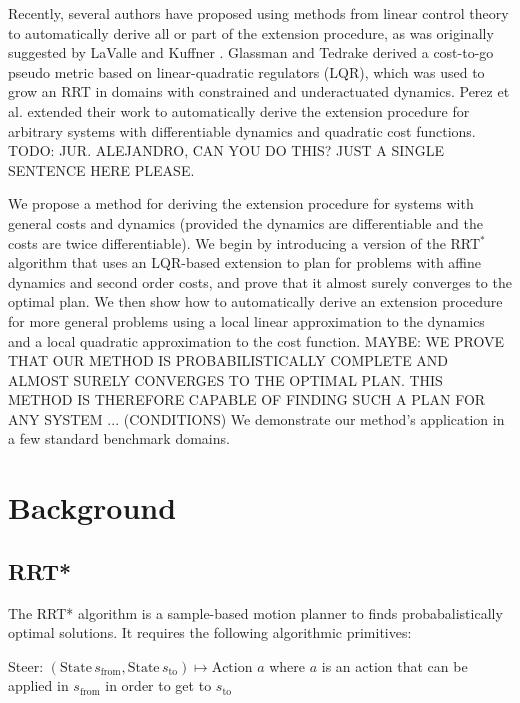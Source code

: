 \documentclass[letterpaper, 10pt, english, conference]{IEEEtran}
\begin{document}
Recently, several authors have proposed using methods from linear
control theory to automatically derive all or part of the extension
procedure, as was originally suggested by LaValle and Kuffner
\cite{lavalle.kuffner.ijrr01}. Glassman and Tedrake \cite{elena.russ.icra10}
derived a cost-to-go pseudo metric based on linear-quadratic regulators (LQR),
which was used to grow an RRT in domains with constrained and 
underactuated dynamics. Perez et al. \cite{Perez12} extended their work
to automatically derive the extension procedure for arbitrary systems
with differentiable dynamics and quadratic cost functions. 
TODO: JUR. ALEJANDRO, CAN YOU DO THIS? JUST A SINGLE SENTENCE HERE
PLEASE.

We propose a method for deriving the extension procedure for systems
with general costs and dynamics (provided the dynamics are differentiable
and the costs are twice differentiable). We begin by introducing a 
version of the RRT$^*$ algorithm that uses an LQR-based
extension to plan for problems with affine dynamics and second order costs,
and prove that it almost surely converges to the optimal plan.  
We then show how to automatically derive an
extension procedure for more general problems using
a local linear approximation to the dynamics and a local quadratic
approximation to the cost function. 
MAYBE: WE PROVE THAT OUR METHOD IS PROBABILISTICALLY COMPLETE AND
ALMOST SURELY CONVERGES TO THE OPTIMAL PLAN. THIS METHOD IS
THEREFORE CAPABLE OF FINDING SUCH A PLAN FOR ANY SYSTEM ... (CONDITIONS)
We demonstrate
our method's application in a few standard benchmark domains. 

%



\section{Background}


\subsection{RRT{*}}

The RRT{*} algorithm is a sample-based motion planner to finds probabalistically
optimal solutions. It requires the following algorithmic primitives:

Steer: $ $$\left(\mbox{State}\, s_{\mbox{from}},\mbox{State}\, s_{\mbox{to}}\right)\mapsto\mbox{Action }a$
where $a$ is an action that can be applied in $s_{\mbox{from}}$
in order to get to $s_{\mbox{to}}$
\end{document}

